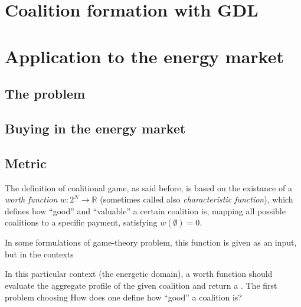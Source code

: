 \documentclass[12pt,a4paper]{report}
\begin{document}

\chapter{Coalition formation with GDL}
\label{chap:gdl}


\chapter{Application to the energy market}
\label{chap:energy}

\section{The problem}

\section{Buying in the energy market}

\section{Metric}

The definition of coalitional game, as said before, is based on the existance of a \textit{worth function} $w : 2^N \to \mathbb{R}$ (sometimes called also \textit{characteristic function}), which defines how ``good'' and ``valuable'' a certain coalition is, mapping all possible coalitions to a specific payment, satisfying $w( \emptyset ) = 0$.

In some formulations of game-theory problem, this function is given as an input, but in the contexts  

In this particular context (the energetic domain), a worth function should evaluate the aggregate profile of the given coalition and return a
.
The first problem choosing How does one define how ``good'' a coalition is?
\end{document}
